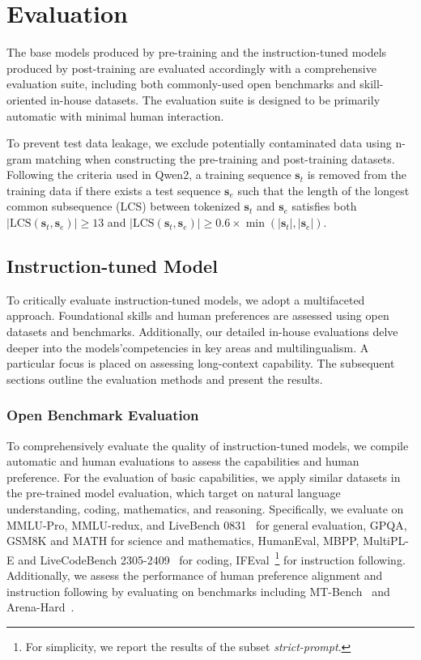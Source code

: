 



\section{Evaluation}
\label{sec:experiment}

The base models produced by pre-training and the instruction-tuned models produced by post-training are evaluated accordingly with a comprehensive evaluation suite, including both commonly-used open benchmarks and skill-oriented in-house datasets.
The evaluation suite is designed to be primarily automatic with minimal human interaction.

To prevent test data leakage, we exclude potentially contaminated data using n-gram matching when constructing the pre-training and post-training datasets. Following the criteria used in Qwen2, a training sequence $\mathbf{s}_t$ is removed from the training data if there exists a test sequence $\mathbf{s}_e$ such that the length of the longest common subsequence (LCS) between tokenized $\mathbf{s}_t$ and $\mathbf{s}_e$ satisfies both $|\text{LCS}(\mathbf{s}_t, \mathbf{s}_e)| \geq 13$ and $|\text{LCS}(\mathbf{s}_t, \mathbf{s}_e)| \geq 0.6 \times \min(|\mathbf{s}_t|, |\mathbf{s}_e|)$.

\subsection{Instruction-tuned Model}

To critically evaluate instruction-tuned models, we adopt a multifaceted approach. 
Foundational skills and human preferences are assessed using open datasets and benchmarks. 
Additionally, our detailed in-house evaluations delve deeper into the models'competencies in key areas and multilingualism. 
A particular focus is placed on assessing long-context capability.
The subsequent sections outline the evaluation methods and present the results.

\subsubsection{Open Benchmark Evaluation}

To comprehensively evaluate the quality of instruction-tuned models, we compile automatic and human evaluations to assess the capabilities and human preference. 
For the evaluation of basic capabilities, we apply similar datasets in the pre-trained model evaluation, which target on natural language understanding, coding, mathematics, and reasoning. 
Specifically, we evaluate on MMLU-Pro, MMLU-redux, and LiveBench 0831~\citep{livebench} for general evaluation, GPQA, GSM8K and MATH for science and mathematics, HumanEval, MBPP, MultiPL-E and LiveCodeBench 2305-2409~\citep{livecodebench} for coding, 
IFEval~\citep{ifeval}\footnote{For simplicity, we report the results of the subset \textit{strict-prompt}.} for instruction following.
Additionally, we assess the performance of human preference alignment and instruction following by evaluating on benchmarks including MT-Bench~\citep{mtbench} and Arena-Hard~\citep{arena-hard}.



